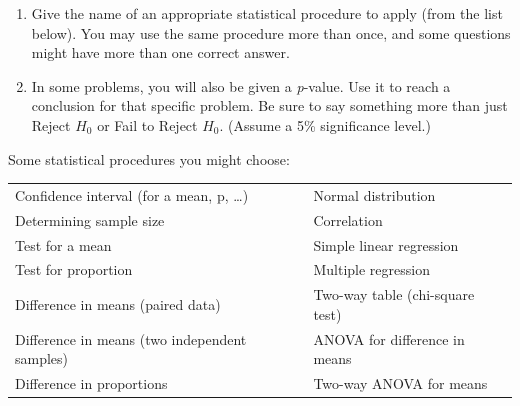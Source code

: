 \renewcommand{\labelenumi}{\arabic{enumi}.}


\begin{enumerate}[leftmargin=1cm, itemsep=.2em]


\item Give the name of an appropriate statistical procedure to apply (from the list below). You may use the same procedure more than once, and some questions might have more than one correct answer.


\item In some problems, you will also be given a \textit{p}-value. Use it to reach a conclusion for that specific problem. Be sure to say something more than just Reject $H_0$ or Fail to Reject $H_0$. (Assume a 5\% significance level.) 


\end{enumerate}





Some statistical procedures you might choose:


\begin{table}[!ht]


\begin{center}


\begin{tabular}{ll}


\hline


Confidence interval (for a mean, p, \ldots) & Normal distribution\\


Determining sample size & Correlation\\


Test for a mean & Simple linear regression\\


Test for proportion & Multiple regression\\


Difference in means (paired data) & Two-way table (chi-square test)\\


Difference in means (two independent samples) & ANOVA for difference in means\\


Difference in proportions & Two-way ANOVA for means\\


\hline


\end{tabular}


\end{center}


\end{table}





